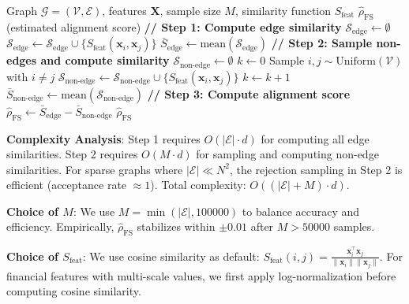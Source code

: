 \begin{algorithm}[h]
\caption{Feature-Structure Alignment Score Computation}
\label{alg:fs_alignment}
\begin{algorithmic}[1]
\REQUIRE Graph $\mathcal{G} = (\mathcal{V}, \mathcal{E})$, features $\mathbf{X}$, sample size $M$, similarity function $S_{\text{feat}}$
\ENSURE $\hat{\rho}_{\text{FS}}$ (estimated alignment score)
\STATE \textbf{// Step 1: Compute edge similarity}
\STATE $\mathcal{S}_{\text{edge}} \leftarrow \emptyset$
    \STATE $\mathcal{S}_{\text{edge}} \leftarrow \mathcal{S}_{\text{edge}} \cup \{S_{\text{feat}}(\mathbf{x}_i, \mathbf{x}_j)\}$
\ENDFOR
\STATE $\bar{S}_{\text{edge}} \leftarrow \text{mean}(\mathcal{S}_{\text{edge}})$
\STATE \textbf{// Step 2: Sample non-edges and compute similarity}
\STATE $\mathcal{S}_{\text{non-edge}} \leftarrow \emptyset$
\STATE $k \leftarrow 0$
    \STATE Sample $i, j \sim \text{Uniform}(\mathcal{V})$ with $i \neq j$
        \STATE $\mathcal{S}_{\text{non-edge}} \leftarrow \mathcal{S}_{\text{non-edge}} \cup \{S_{\text{feat}}(\mathbf{x}_i, \mathbf{x}_j)\}$
        \STATE $k \leftarrow k + 1$
    \ENDIF
\ENDWHILE
\STATE $\bar{S}_{\text{non-edge}} \leftarrow \text{mean}(\mathcal{S}_{\text{non-edge}})$
\STATE \textbf{// Step 3: Compute alignment score}
\STATE $\hat{\rho}_{\text{FS}} \leftarrow \bar{S}_{\text{edge}} - \bar{S}_{\text{non-edge}}$
\RETURN $\hat{\rho}_{\text{FS}}$
\end{algorithmic}
\end{algorithm}

\textbf{Complexity Analysis}: Step 1 requires $O(|\mathcal{E}| \cdot d)$ for computing all edge similarities. Step 2 requires $O(M \cdot d)$ for sampling and computing non-edge similarities. For sparse graphs where $|\mathcal{E}| \ll N^2$, the rejection sampling in Step 2 is efficient (acceptance rate $\approx 1$). Total complexity: $O((|\mathcal{E}| + M) \cdot d)$.

\textbf{Choice of $M$}: We use $M = \min(|\mathcal{E}|, 100000)$ to balance accuracy and efficiency. Empirically, $\hat{\rho}_{\text{FS}}$ stabilizes within $\pm 0.01$ after $M > 50000$ samples.

\textbf{Choice of $S_{\text{feat}}$}: We use cosine similarity as default: $S_{\text{feat}}(i,j) = \frac{\mathbf{x}_i^\top \mathbf{x}_j}{\|\mathbf{x}_i\| \|\mathbf{x}_j\|}$. For financial features with multi-scale values, we first apply log-normalization before computing cosine similarity.

